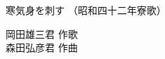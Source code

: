 \documentclass[10pt,b5j]{tarticle} %
\begin{document}
\begin{minipage}[c]{0.7\hsize} %
    \begin{center}
        {\LARGE
            寒気身を刺す %
        }
        {\small 
            （昭和四十二年寮歌） %
        }
    \end{center}
\end{minipage}
\begin{minipage}[c]{0.3\hsize} %
    \begin{flushright} %
        岡田雄三君 作歌\\森田弘彦君 作曲 %
    \end{flushright}
\end{minipage}
\end{document}
